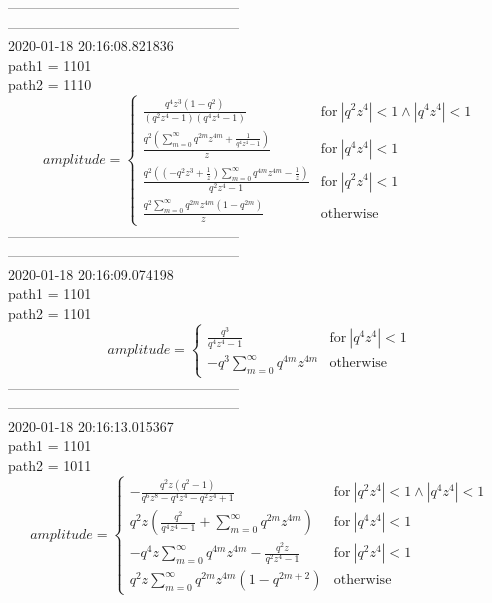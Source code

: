 --------------------------------------------------\\
--------------------------------------------------\\
2020-01-18 20:16:08.821836\\
path1 = 1101\\
path2 = 1110\\
$$amplitude = \begin{cases} \frac{q^{4} z^{3} \left(1 - q^{2}\right)}{\left(q^{2} z^{4} - 1\right) \left(q^{4} z^{4} - 1\right)} & \text{for}\: \left|{q^{2} z^{4}}\right| < 1 \wedge \left|{q^{4} z^{4}}\right| < 1 \\\frac{q^{2} \left(\sum_{m=0}^{\infty} q^{2 m} z^{4 m} + \frac{1}{q^{4} z^{4} - 1}\right)}{z} & \text{for}\: \left|{q^{4} z^{4}}\right| < 1 \\\frac{q^{2} \left(\left(- q^{2} z^{3} + \frac{1}{z}\right) \sum_{m=0}^{\infty} q^{4 m} z^{4 m} - \frac{1}{z}\right)}{q^{2} z^{4} - 1} & \text{for}\: \left|{q^{2} z^{4}}\right| < 1 \\\frac{q^{2} \sum_{m=0}^{\infty} q^{2 m} z^{4 m} \left(1 - q^{2 m}\right)}{z} & \text{otherwise} \end{cases}$$
--------------------------------------------------\\
--------------------------------------------------\\
2020-01-18 20:16:09.074198\\
path1 = 1101\\
path2 = 1101\\
$$amplitude = \begin{cases} \frac{q^{3}}{q^{4} z^{4} - 1} & \text{for}\: \left|{q^{4} z^{4}}\right| < 1 \\- q^{3} \sum_{m=0}^{\infty} q^{4 m} z^{4 m} & \text{otherwise} \end{cases}$$
--------------------------------------------------\\
--------------------------------------------------\\
2020-01-18 20:16:13.015367\\
path1 = 1101\\
path2 = 1011\\
$$amplitude = \begin{cases} - \frac{q^{2} z \left(q^{2} - 1\right)}{q^{6} z^{8} - q^{4} z^{4} - q^{2} z^{4} + 1} & \text{for}\: \left|{q^{2} z^{4}}\right| < 1 \wedge \left|{q^{4} z^{4}}\right| < 1 \\q^{2} z \left(\frac{q^{2}}{q^{4} z^{4} - 1} + \sum_{m=0}^{\infty} q^{2 m} z^{4 m}\right) & \text{for}\: \left|{q^{4} z^{4}}\right| < 1 \\- q^{4} z \sum_{m=0}^{\infty} q^{4 m} z^{4 m} - \frac{q^{2} z}{q^{2} z^{4} - 1} & \text{for}\: \left|{q^{2} z^{4}}\right| < 1 \\q^{2} z \sum_{m=0}^{\infty} q^{2 m} z^{4 m} \left(1 - q^{2 m + 2}\right) & \text{otherwise} \end{cases}$$
